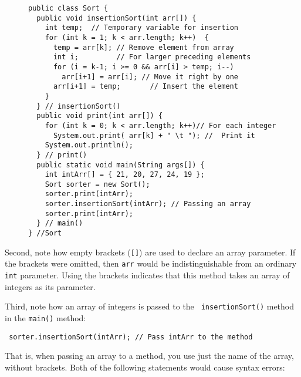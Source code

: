 \begin{figure}[bth]
\jjjprogstart
\begin{jjjlisting}
\begin{lstlisting}
public class Sort {
  public void insertionSort(int arr[]) {
    int temp;  // Temporary variable for insertion
    for (int k = 1; k < arr.length; k++)  { 
      temp = arr[k]; // Remove element from array
      int i;         // For larger preceding elements
      for (i = k-1; i >= 0 && arr[i] > temp; i--) 
        arr[i+1] = arr[i]; // Move it right by one
      arr[i+1] = temp;       // Insert the element
    }
  } // insertionSort()
  public void print(int arr[]) {
    for (int k = 0; k < arr.length; k++)// For each integer
      System.out.print( arr[k] + " \t "); //  Print it
    System.out.println();
  } // print()
  public static void main(String args[]) {
    int intArr[] = { 21, 20, 27, 24, 19 };
    Sort sorter = new Sort();
    sorter.print(intArr);
    sorter.insertionSort(intArr); // Passing an array
    sorter.print(intArr);
  } // main()
} //Sort
\end{lstlisting}
\end{jjjlisting}
\end{figure}

Second, note how empty brackets ({\tt []}) are used to
 declare an array parameter.  If the
brackets were omitted, then {\tt arr} would be indistinguishable from
an ordinary {\tt int} parameter.  Using the brackets indicates that
this method takes an array of integers as its parameter.


Third, note how an array of integers is passed to the {\tt
insertionSort()} method in the {\tt main()} method:

\begin{jjjlisting}
\begin{lstlisting}
 sorter.insertionSort(intArr); // Pass intArr to the method
\end{lstlisting}
\end{jjjlisting}

\noindent That is, when passing an array to a method, you use just the
name of the array, without brackets. Both of the following statements
would cause syntax errors:

